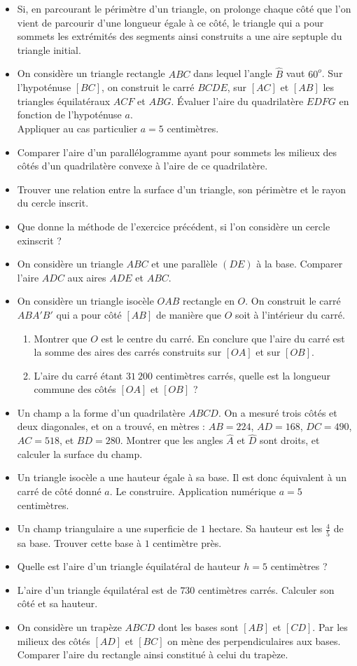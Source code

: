 \documentclass[12 pt]{report}
\theoremstyle{plain}
\newcounter{n}
\renewcommand{\it}{\item[$\mathbf{\then}.$]\stepcounter{n} }
\begin{document}
\begin{itemize}
\it Si, en parcourant le périmètre d'un triangle, on prolonge chaque côté que l'on vient de parcourir d'une longueur égale à ce côté, le triangle qui a pour sommets les extrémités des segments ainsi construits a une aire septuple du triangle initial. 
\it On considère un triangle rectangle $ABC$ dans lequel l'angle $\widehat{B}$ vaut $60^o$. Sur l'hypoténuse $[BC]$, on construit le carré $BCDE$, sur $[AC]$ et $[AB]$ les triangles équilatéraux $ACF$ et $ABG$. Évaluer l'aire du quadrilatère $EDFG$ en fonction de l'hypoténuse $a$. \\ Appliquer au cas particulier $a=5$ centimètres. 
\it Comparer l'aire d'un parallélogramme ayant pour sommets les milieux 
des côtés d'un quadrilatère convexe à l'aire de ce quadrilatère. 
\it Trouver une relation entre la surface d'un triangle, son périmètre et le rayon du cercle inscrit. 
\it Que donne la méthode de l'exercice précédent, si l'on considère un cercle exinscrit ? 
\it On considère un triangle $ABC$ et une parallèle $(DE)$ à la base. Comparer l'aire $ADC$ aux aires $ADE$ et $ABC$. 
\it On considère un triangle isocèle $OAB$ rectangle en $O$. On construit le carré $ABA'B'$ qui a pour côté $[AB]$ de manière que $O$ soit à l'intérieur du carré. \begin{enumerate}
\item Montrer que $O$ est le centre du carré. En conclure que l'aire du carré est la somme des aires des carrés construits sur $[OA]$ et sur $[OB]$. 
\it L'aire du carré étant $31~200$ centimètres carrés, quelle est la 
longueur commune des côtés $[OA]$ et $[OB]$ ? 
\end{enumerate}
\it Un champ a la forme d'un quadrilatère $ABCD$. On a mesuré trois côtés et deux diagonales, et on a trouvé, en mètres : $AB = 224$, $AD = 168$, $DC=490$, $AC= 518$, et $BD = 280$. Montrer que les angles $\widehat{A}$ et $\widehat{D}$ sont droits, et calculer la surface du champ. 
\it Un triangle isocèle a une hauteur égale à sa base. Il est donc équivalent à un carré de côté donné $a$. Le construire. Application numérique $a=5$ centimètres. 
\it Un champ triangulaire a une superficie de $1$ hectare. Sa hauteur est les $\frac45$ de sa base. Trouver cette base à $1$ centimètre près. 
\it Quelle est l'aire d'un triangle équilatéral de hauteur $h=5$ centimètres ? 
\it L'aire d'un triangle équilatéral est de $730$ centimètres carrés. Calculer son côté et sa hauteur. 
\it On considère un trapèze $ABCD$ dont les bases sont $[AB]$ et $[CD]$. Par les milieux des côtés $[AD]$ et $[BC]$ on mène des perpendiculaires aux bases. Comparer l'aire du rectangle ainsi constitué à celui du trapèze. 

\end{itemize}
\end{document}
